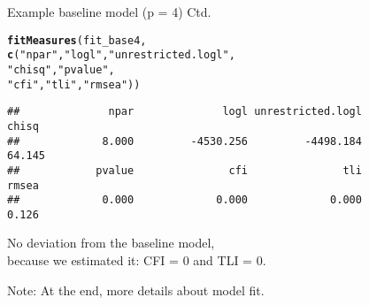 \documentclass[10pt]{beamer}\usepackage[]{graphicx}\usepackage[]{xcolor}
\makeatletter
\newcommand{\hlsng}[1]{\textcolor[rgb]{0.192,0.494,0.8}{#1}}%
\newcommand{\hldef}[1]{\textcolor[rgb]{0.345,0.345,0.345}{#1}}%
\newcommand{\hlkwd}[1]{\textcolor[rgb]{0.737,0.353,0.396}{\textbf{#1}}}%
\newenvironment{kframe}{%
 \def\at@end@of@kframe{}%
 \ifinner\ifhmode%
  \def\at@end@of@kframe{\end{minipage}}%
  \begin{minipage}{\columnwidth}%
 \fi\fi%
 \def\FrameCommand##1{\hskip\@totalleftmargin \hskip-\fboxsep
 \colorbox{shadecolor}{##1}\hskip-\fboxsep
     \hskip-\linewidth \hskip-\@totalleftmargin \hskip\columnwidth}%
 \MakeFramed {\advance\hsize-\width
   \@totalleftmargin\z@ \linewidth\hsize
   \@setminipage}}%
 {\par\unskip\endMakeFramed%
 \at@end@of@kframe}
\newenvironment{knitrout}{}{} %
\makeatother
\begin{document}
\begin{frame}[fragile]{Example baseline model (p = 4) Ctd.}

\begin{knitrout}
\color{fgcolor}\begin{kframe}
\begin{alltt}
\hlkwd{fitMeasures}\hldef{(fit_base4,}
            \hlkwd{c}\hldef{(}\hlsng{"npar"}\hldef{,} \hlsng{"logl"}\hldef{,} \hlsng{"unrestricted.logl"}\hldef{,}
              \hlsng{"chisq"}\hldef{,} \hlsng{"pvalue"}\hldef{,}
              \hlsng{"cfi"}\hldef{,} \hlsng{"tli"}\hldef{,} \hlsng{"rmsea"}\hldef{))}
\end{alltt}
\begin{verbatim}
##              npar              logl unrestricted.logl             chisq 
##             8.000         -4530.256         -4498.184            64.145 
##            pvalue               cfi               tli             rmsea 
##             0.000             0.000             0.000             0.126
\end{verbatim}
\end{kframe}
\end{knitrout}

\vspace{5mm}

No deviation from the baseline model, \\
because we estimated it: CFI = 0 and TLI = 0.

\vspace{5mm}

Note: At the end, more details about model fit.

\end{frame}
%
\end{document}
